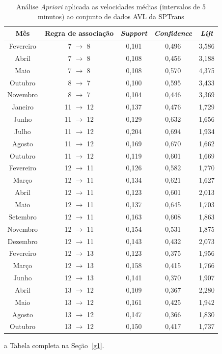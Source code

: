 \documentclass[
	12pt,				%
	oneside,			%
	a4paper,			%
	english,			%
	brazil				%
	]{abntex2ppgsi}
\begin{document}
{{{\begin{table}[!htb]
\centering
\begin{threeparttable}
\caption {Análise \textit{Apriori} aplicada as velocidades médias (intervalos de 5 minutos) ao conjunto de dados AVL da SPTrans}
\label {tab:aprioriFull}
\begin{tabular}{c|c|c|c|c}
\toprule
\textbf{Mês} & \textbf{Regra de associação} & \textit{\textbf{Support}} & \textit{\textbf{Confidence}} & \textit{\textbf{Lift}} \\
\midrule
Fevereiro & 7 $\rightarrow$ 8 & 0,101 & 0,496 & 3,586\\
Abril & 7 $\rightarrow$ 8  & 0,108 & 0,456 & 3,188\\
Maio & 7 $\rightarrow$ 8 & 0,108 & 0,570 & 4,375\\
\midrule
Outubro & 8 $\rightarrow$ 7 & 0,100 & 0,595 & 3,433\\
Novembro & 8 $\rightarrow$ 7 & 0,104 & 0,446 & 3,369\\
\midrule
Janeiro & 11 $\rightarrow$ 12 & 0,137 & 0,476 & 1,729 \\
Junho & 11 $\rightarrow$ 12 & 0,129 & 0,632 & 1,656\\
Julho & 11 $\rightarrow$ 12 & 0,204 & 0,694 & 1,934\\
Agosto & 11 $\rightarrow$ 12 & 0,169 & 0,670 & 1,662\\
Outubro & 11 $\rightarrow$ 12 & 0,119 & 0,601 & 1,669\\
\midrule
Fevereiro & 12 $\rightarrow$ 11 & 0,126 & 0,582 & 1,770\\
Março & 12 $\rightarrow$ 11 & 0,134 & 0,621 & 1,627\\
Abril & 12 $\rightarrow$ 11 & 0,123 & 0,601 & 2,013\\
Maio & 12 $\rightarrow$ 11 & 0,137 & 0,645 & 1,703\\
Setembro & 12 $\rightarrow$ 11 & 0,163 & 0,608 & 1,863\\
Novembro & 12 $\rightarrow$ 11 & 0,154 & 0,531 & 1,875\\
Dezembro & 12 $\rightarrow$ 11 & 0,143 & 0,432 & 2,073\\
\midrule
Fevereiro & 12 $\rightarrow$ 13 & 0,123 & 0,375 & 1,956\\
Março & 12 $\rightarrow$ 13 & 0,158 & 0,415 & 1,766\\
Junho & 12 $\rightarrow$ 13 & 0,141 & 0,370 & 1,907\\
\midrule
Abril  & 13 $\rightarrow$ 12 & 0,109 & 0,367 & 2,280\\
Maio & 13 $\rightarrow$ 12 & 0,161 & 0,425 & 1,942\\
Agosto & 13 $\rightarrow$ 12 & 0,147 & 0,366 & 1,830\\
Outubro & 13 $\rightarrow$ 12 & 0,150 & 0,417 & 1,737\\
\bottomrule
\end{tabular}
\begin{tablenotes}
            \item[a] Tabela completa na Seção~\ref{g1}.
        \end{tablenotes}
\end{threeparttable}
\end{table}

}}}
\end{document}
